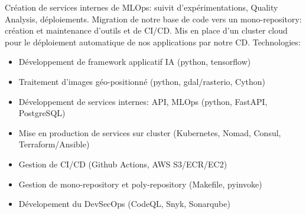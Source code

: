 {  Création de services internes de MLOps: suivit d’expérimentations, Quality Analysis, déploiements.\newline{}
  Migration de notre base de code vers un mono-repository: création et maintenance d'outils et de CI/CD.\newline{}
  Mis en place d'un cluster cloud pour le déploiement automatique de nos applications par notre CD.\newline{}
  Technologies:
  \begin{itemize}
    \item Développement de framework applicatif IA (python, tensorflow)
    \item Traitement d'images géo-positionné (python, gdal/rasterio, Cython)
    \item Développement de services internes: API, MLOps (python, FastAPI, PostgreSQL) 
    \item Mise en production de services sur cluster (Kubernetes, Nomad, Consul, Terraform/Ansible)
    \item Gestion de CI/CD (Github Actions, AWS S3/ECR/EC2)
    \item Gestion de mono-repository et poly-repository (Makefile, pyinvoke)
    \item Dévelopement du DevSecOps (CodeQL, Snyk, Sonarqube)
  \end{itemize}
  \fi
}



